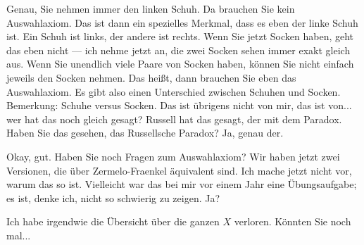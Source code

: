 \begin{spoken-clean}[continued]
Genau, Sie nehmen immer den linken Schuh. Da brauchen Sie kein Auswahlaxiom. Das ist dann ein spezielles Merkmal, dass es eben der linke Schuh ist. Ein Schuh ist links, der andere ist rechts. Wenn Sie jetzt Socken haben, geht das eben nicht --- ich nehme jetzt an, die zwei Socken sehen immer exakt gleich aus. Wenn Sie unendlich viele Paare von Socken haben, können Sie nicht einfach jeweils den  Socken nehmen. Das heißt, dann brauchen Sie eben das Auswahlaxiom. Es gibt also einen Unterschied zwischen Schuhen und Socken. Bemerkung: Schuhe versus Socken. Das ist übrigens nicht von mir, das ist von... wer hat das noch gleich gesagt? Russell hat das gesagt, der mit dem Paradox. Haben Sie das gesehen, das Russellsche Paradox? Ja, genau der. 

Okay, gut. Haben Sie noch Fragen zum Auswahlaxiom? Wir haben jetzt zwei Versionen, die über Zermelo-Fraenkel äquivalent sind. Ich mache jetzt nicht vor, warum das so ist. Vielleicht war das bei mir vor einem Jahr eine Übungsaufgabe; es ist, denke ich, nicht so schwierig zu zeigen. Ja?
\end{spoken-clean}

\begin{student-interaction}[Studentenfrage]
Ich habe irgendwie die Übersicht über die ganzen $X$ verloren. Könnten Sie noch mal...
\end{student-interaction}

